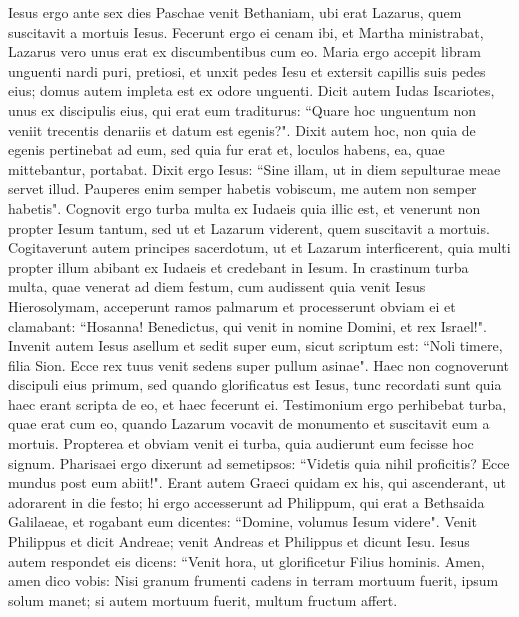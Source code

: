 \begin{biblechapter} 
\verse Iesus ergo ante sex dies Paschae venit Bethaniam, ubi erat Lazarus, quem suscitavit a mortuis Iesus.  
\verse Fecerunt ergo ei cenam ibi, et Martha ministrabat, Lazarus vero unus erat ex discumbentibus cum eo. 
\verse Maria ergo accepit libram unguenti nardi puri, pretiosi, et unxit pedes Iesu et extersit capillis suis pedes eius; domus autem impleta est ex odore unguenti. 
\verse Dicit autem Iudas Iscariotes, unus ex discipulis eius, qui erat eum traditurus: 
\verse “Quare hoc unguentum non veniit trecentis denariis et datum est egenis?". 
\verse Dixit autem hoc, non quia de egenis pertinebat ad eum, sed quia fur erat et, loculos habens, ea, quae mittebantur, portabat. 
\verse Dixit ergo Iesus: “Sine illam, ut in diem sepulturae meae servet illud. 
\verse Pauperes enim semper habetis vobiscum, me autem non semper habetis". 
\verse Cognovit ergo turba multa ex Iudaeis quia illic est, et venerunt non propter Iesum tantum, sed ut et Lazarum viderent, quem suscitavit a mortuis. 
\verse Cogitaverunt autem principes sacerdotum, ut et Lazarum interficerent, 
\verse quia multi propter illum abibant ex Iudaeis et credebant in Iesum. 
\verse In crastinum turba multa, quae venerat ad diem festum, cum audissent quia venit Iesus Hierosolymam, 
\verse acceperunt ramos palmarum et processerunt obviam ei et clamabant: “Hosanna! Benedictus, qui venit in nomine Domini, et rex Israel!". 
\verse Invenit autem Iesus asellum et sedit super eum, sicut scriptum est: 
\verse “Noli timere, filia Sion. Ecce rex tuus venit sedens super pullum asinae". 
\verse Haec non cognoverunt discipuli eius primum, sed quando glorificatus est Iesus, tunc recordati sunt quia haec erant scripta de eo, et haec fecerunt ei. 
\verse Testimonium ergo perhibebat turba, quae erat cum eo, quando Lazarum vocavit de monumento et suscitavit eum a mortuis. 
\verse Propterea et obviam venit ei turba, quia audierunt eum fecisse hoc signum. 
\verse Pharisaei ergo dixerunt ad semetipsos: “Videtis quia nihil proficitis? Ecce mundus post eum abiit!". 
\verse Erant autem Graeci quidam ex his, qui ascenderant, ut adorarent in die festo; 
\verse hi ergo accesserunt ad Philippum, qui erat a Bethsaida Galilaeae, et rogabant eum dicentes: “Domine, volumus Iesum videre". 
\verse Venit Philippus et dicit Andreae; venit Andreas et Philippus et dicunt Iesu. 
\verse Iesus autem respondet eis dicens: “Venit hora, ut glorificetur Filius hominis. 
\verse Amen, amen dico vobis: Nisi granum frumenti cadens in terram mortuum fuerit, ipsum solum manet; si autem mortuum fuerit, multum fructum affert. 

\end{biblechapter}
